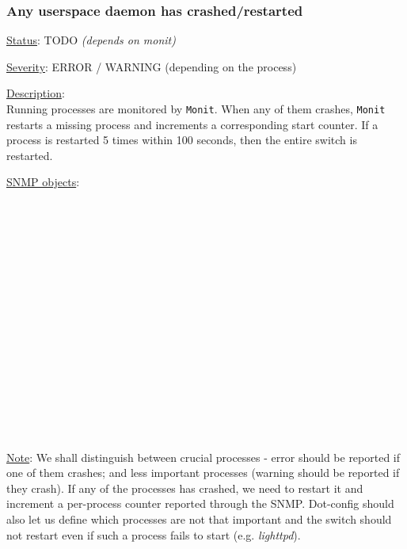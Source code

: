 \subsubsection{\bf Any userspace daemon has crashed/restarted}
		\label{fail:other:daemon_crash}
		\begin{pck_descr}
			\item [] \underline{Status}: TODO \emph{(depends on monit)}
			\item [] \underline{Severity}: ERROR / WARNING (depending on the process)
			\item [] \underline{Description}:\\
				Running processes are monitored by \texttt{Monit}. When any of them
				crashes, \texttt{Monit} restarts a missing process and increments a
				corresponding start counter. If a process is restarted 5 times within
				100 seconds, then the entire switch is restarted.
			\item [] \underline{SNMP objects}:\\
				{\footnotesize
				 \\
				\\
				\\
				\\
				\\
				\\
				\\
				\\
				\\
				\\
				\\
				\\
				\\
				\\
				 \\
				\\
				 }
			\item [] \underline{Note}: We shall distinguish between crucial
				processes - error should be reported if one of them crashes; and less
				important processes (warning should be reported if they crash). If any
				of the processes has crashed, we need to restart it and increment a
				per-process counter reported through the SNMP. Dot-config should also
				let us define which processes are not that important and the switch
				should not restart even if such a process fails to start (e.g.
				\emph{lighttpd}).


\end{pck_descr}
